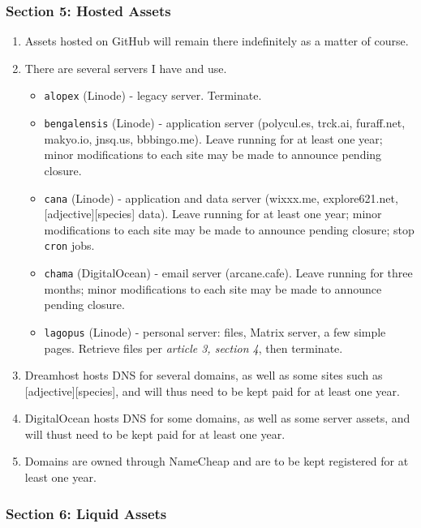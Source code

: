 \subsubsection*{Section 5: Hosted Assets}\label{section-5-hosted-assets}

\begin{enumerate}
\def\labelenumi{\arabic{enumi}.}
\tightlist
\item
  Assets hosted on GitHub will remain there indefinitely as a matter of course.
\item
  There are several servers I have and use.

  \begin{itemize}
  \tightlist
  \item
    \texttt{alopex} (Linode) - legacy server. Terminate.
  \item
    \texttt{bengalensis} (Linode) - application server (polycul.es, trck.ai, furaff.net, makyo.io, jnsq.us, bbbingo.me). Leave running for at least one year; minor modifications to each site may be made to announce pending closure.
  \item
    \texttt{cana} (Linode) - application and data server (wixxx.me, explore621.net, {[}adjective{]}{[}species{]} data). Leave running for at least one year; minor modifications to each site may be made to announce pending closure; stop \texttt{cron} jobs.
  \item
    \texttt{chama} (DigitalOcean) - email server (arcane.cafe). Leave running for three months; minor modifications to each site may be made to announce pending closure.
  \item
    \texttt{lagopus} (Linode) - personal server: files, Matrix server, a few simple pages. Retrieve files per \emph{article 3, section 4}, then terminate.
  \end{itemize}
\item
  Dreamhost hosts DNS for several domains, as well as some sites such as {[}adjective{]}{[}species{]}, and will thus need to be kept paid for at least one year.
\item
  DigitalOcean hosts DNS for some domains, as well as some server assets, and will thust need to be kept paid for at least one year.
\item
  Domains are owned through NameCheap and are to be kept registered for at least one year.
\end{enumerate}

\subsubsection*{Section 6: Liquid Assets}\label{section-6-liquid-assets}

